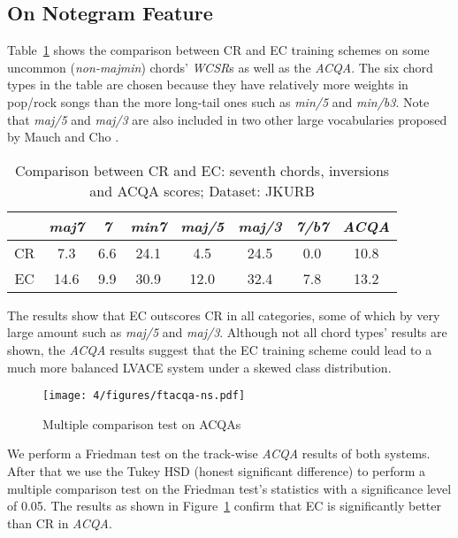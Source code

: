 \subsection{On Notegram Feature}
Table~\ref{tab:4-acqa-ns} shows the comparison between CR and EC training schemes on some uncommon (\textit{non-majmin}) \cite{burgoyne2011expert} chords' \textit{WCSR}s as well as the \textit{ACQA}. The six chord types in the table are chosen because they have relatively more weights in pop/rock songs than the more long-tail ones such as \textit{min/5} and \textit{min/b3}. Note that \textit{maj/5} and \textit{maj/3} are also included in two other large vocabularies proposed by Mauch \cite{mauch2010automatic} and Cho \cite{cho2014improved}.
\begin{table}[htb]
	\caption{Comparison between CR and EC: seventh chords, inversions and ACQA scores; Dataset: JKURB}
	\centering
	\scriptsize
	\begin{tabular}{|c|c|c|c|c|c|c|c|} \hline
		& \textit{maj7} & \textit{7} & \textit{min7} & \textit{maj/5} & \textit{maj/3} & \textit{7/b7} & \textit{ACQA} \\ \hline
		CR & 7.3 & 6.6 & 24.1 & 4.5 & 24.5 & 0.0 & 10.8 \\ \hline
		EC &  14.6 & 9.9 & 30.9 & 12.0 & 32.4 & 7.8 & 13.2 \\ \hline
	\end{tabular}
	\label{tab:4-acqa-ns}
\end{table}

The results show that EC outscores CR in all categories, some of which by very large amount such as \textit{maj/5} and \textit{maj/3}. Although not all chord types' results are shown, the \textit{ACQA} results suggest that the EC training scheme could lead to a much more balanced LVACE system under a skewed class distribution.

\begin{figure}[htb]
	\centering
	\texttt{[image: 4/figures/ftacqa-ns.pdf]}
	\caption{Multiple comparison test on ACQAs}
	\label{fig:4-ftacqa-ns}
\end{figure}
We perform a Friedman test on the track-wise \textit{ACQA} results of both systems. After that we use the Tukey HSD (honest significant difference) to perform a multiple comparison test on the Friedman test's statistics with a significance level of 0.05. The results as shown in Figure~\ref{fig:4-ftacqa-ns} confirm that EC is significantly better than CR in \textit{ACQA}.

